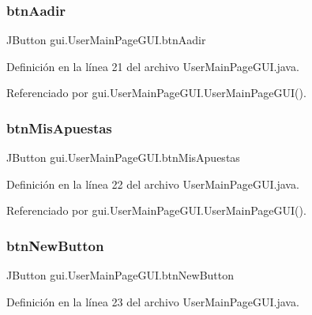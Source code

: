 \subsubsection{\texorpdfstring{btnAadir}{btnAadir}}
{\footnotesize\ttfamily J\+Button gui.\+User\+Main\+Page\+G\+U\+I.\+btn\+Aadir\hspace{0.3cm}{\ttfamily [private]}}



Definición en la línea 21 del archivo User\+Main\+Page\+G\+U\+I.\+java.



Referenciado por gui.\+User\+Main\+Page\+G\+U\+I.\+User\+Main\+Page\+G\+U\+I().

\mbox{\label{classgui_1_1UserMainPageGUI_aaa882a6ea2015ea8d12bcea1cbd539c7}} 
\subsubsection{\texorpdfstring{btnMisApuestas}{btnMisApuestas}}
{\footnotesize\ttfamily J\+Button gui.\+User\+Main\+Page\+G\+U\+I.\+btn\+Mis\+Apuestas\hspace{0.3cm}{\ttfamily [private]}}



Definición en la línea 22 del archivo User\+Main\+Page\+G\+U\+I.\+java.



Referenciado por gui.\+User\+Main\+Page\+G\+U\+I.\+User\+Main\+Page\+G\+U\+I().

\mbox{\label{classgui_1_1UserMainPageGUI_ae4286f606454db2acce1ec498854c19e}} 
\subsubsection{\texorpdfstring{btnNewButton}{btnNewButton}}
{\footnotesize\ttfamily J\+Button gui.\+User\+Main\+Page\+G\+U\+I.\+btn\+New\+Button\hspace{0.3cm}{\ttfamily [private]}}



Definición en la línea 23 del archivo User\+Main\+Page\+G\+U\+I.\+java.



